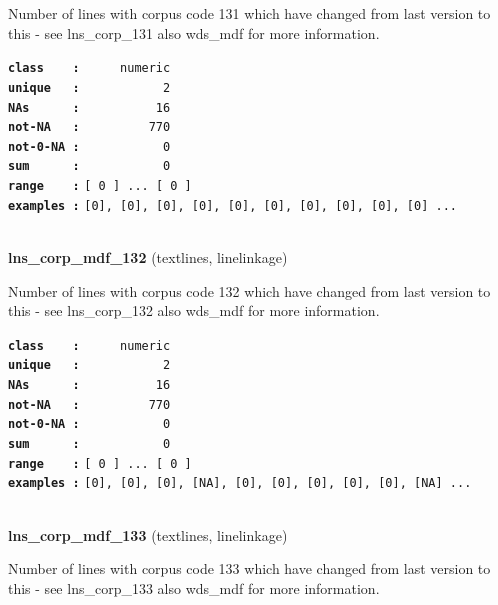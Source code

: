 \documentclass[]{article}
\begin{document}
Number of lines with corpus code 131 which have changed from last
version to this - see lns\_corp\_131 also wds\_mdf for more information.

\textbf{\texttt{class\ \ \ \ :}} \texttt{~~~~~numeric}\\
\textbf{\texttt{unique\ \ \ :}} \texttt{~~~~~~~~~~~2}\\
\textbf{\texttt{NAs\ \ \ \ \ \ :}} \texttt{~~~~~~~~~~16}\\
\textbf{\texttt{not-NA\ \ \ :}} \texttt{~~~~~~~~~770}\\
\textbf{\texttt{not-0-NA\ :}} \texttt{~~~~~~~~~~~0}\\
\textbf{\texttt{sum\ \ \ \ \ \ :}} \texttt{~~~~~~~~~~~0}\\
\textbf{\texttt{range\ \ \ \ :}}
\texttt{{[}\ 0\ {]}\ ...\ {[}\ 0\ {]}}\\
\textbf{\texttt{examples\ :}}
\texttt{{[}0{]},\ {[}0{]},\ {[}0{]},\ {[}0{]},\ {[}0{]},\ {[}0{]},\ {[}0{]},\ {[}0{]},\ {[}0{]},\ {[}0{]}\ ...}\\

~

\textbf{lns\_corp\_mdf\_132} (textlines, linelinkage)

Number of lines with corpus code 132 which have changed from last
version to this - see lns\_corp\_132 also wds\_mdf for more information.

\textbf{\texttt{class\ \ \ \ :}} \texttt{~~~~~numeric}\\
\textbf{\texttt{unique\ \ \ :}} \texttt{~~~~~~~~~~~2}\\
\textbf{\texttt{NAs\ \ \ \ \ \ :}} \texttt{~~~~~~~~~~16}\\
\textbf{\texttt{not-NA\ \ \ :}} \texttt{~~~~~~~~~770}\\
\textbf{\texttt{not-0-NA\ :}} \texttt{~~~~~~~~~~~0}\\
\textbf{\texttt{sum\ \ \ \ \ \ :}} \texttt{~~~~~~~~~~~0}\\
\textbf{\texttt{range\ \ \ \ :}}
\texttt{{[}\ 0\ {]}\ ...\ {[}\ 0\ {]}}\\
\textbf{\texttt{examples\ :}}
\texttt{{[}0{]},\ {[}0{]},\ {[}0{]},\ {[}NA{]},\ {[}0{]},\ {[}0{]},\ {[}0{]},\ {[}0{]},\ {[}0{]},\ {[}NA{]}\ ...}\\

~

\textbf{lns\_corp\_mdf\_133} (textlines, linelinkage)

Number of lines with corpus code 133 which have changed from last
version to this - see lns\_corp\_133 also wds\_mdf for more information.
\end{document}
